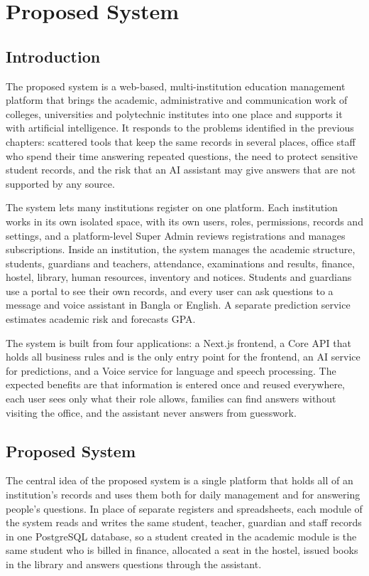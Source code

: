 \chapter{Proposed System}

\section{Introduction}
The proposed system is a web-based, multi-institution education management platform that brings the academic, administrative and communication work of colleges, universities and polytechnic institutes into one place and supports it with artificial intelligence. It responds to the problems identified in the previous chapters: scattered tools that keep the same records in several places, office staff who spend their time answering repeated questions, the need to protect sensitive student records, and the risk that an AI assistant may give answers that are not supported by any source.

The system lets many institutions register on one platform. Each institution works in its own isolated space, with its own users, roles, permissions, records and settings, and a platform-level Super Admin reviews registrations and manages subscriptions. Inside an institution, the system manages the academic structure, students, guardians and teachers, attendance, examinations and results, finance, hostel, library, human resources, inventory and notices. Students and guardians use a portal to see their own records, and every user can ask questions to a message and voice assistant in Bangla or English. A separate prediction service estimates academic risk and forecasts GPA.

The system is built from four applications: a Next.js frontend, a Core API that holds all business rules and is the only entry point for the frontend, an AI service for predictions, and a Voice service for language and speech processing. The expected benefits are that information is entered once and reused everywhere, each user sees only what their role allows, families can find answers without visiting the office, and the assistant never answers from guesswork.

\section{Proposed System}
The central idea of the proposed system is a single platform that holds all of an institution's records and uses them both for daily management and for answering people's questions. In place of separate registers and spreadsheets, each module of the system reads and writes the same student, teacher, guardian and staff records in one PostgreSQL database, so a student created in the academic module is the same student who is billed in finance, allocated a seat in the hostel, issued books in the library and answers questions through the assistant.

